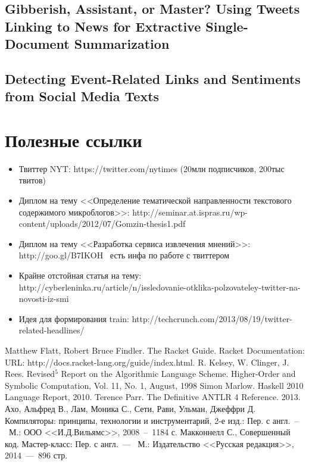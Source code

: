 \documentclass[12pt,a4paper,oneside]{extarticle}
\begin{document}
    \subsection{Gibberish, Assistant, or Master? Using Tweets Linking to News for Extractive Single-Document Summarization}
    \subsection{Detecting Event-Related Links and Sentiments from Social Media Texts}

\section{Полезные ссылки}

    \begin{itemize}
        \item Твиттер NYT: https://twitter.com/nytimes (20млн подписчиков, 200тыс твитов)
        \item Диплом на тему <<Определение тематической направленности текстового содержимого микроблогов>>: http://seminar.at.ispras.ru/wp-content/uploads/2012/07/Gomzin-thesis1.pdf
        \item Диплом на тему <<Разработка сервиса извлечения мнений>>: http://goo.gl/B7IKOH \
            есть инфа по работе с твиттером
        \item Крайне отстойная статья на тему: http://cyberleninka.ru/article/n/issledovanie-otklika-polzovateley-twitter-na-novosti-iz-smi
        \item Идея для формирования train: http://techcrunch.com/2013/08/19/twitter-related-headlines/

    \end{itemize}


\clearpage

\begin{thebibliography}{0}
     Matthew Flatt, Robert Bruce Findler. The Racket Guide. Racket Documentation: URL: http://docs.racket-lang.org/guide/index.html.
    \bibitem{r5rs} R. Kelsey, W. Clinger, J. Rees. Revised$^5$ Report on the Algorithmic Language Scheme. Higher-Order and Symbolic Computation, Vol. 11, No. 1, August, 1998
    \bibitem{haskell} Simon Marlow. Haskell 2010 Language Report, 2010.
    \bibitem{antlr} Terence Parr. The Definitive ANTLR 4 Reference. 2013.
    \bibitem{dragon} Ахо, Альфред В., Лам, Моника С., Сети, Рави, Ульман, Джеффри Д. Компиляторы: принципы, технологии и инструментарий, 2-е изд.: Пер. с англ.~--~М.: ООО <<И.Д.Вильямс>>, 2008~--~1184 с.
    \bibitem{mcconnell} Макконнелл С., Совершенный код. Мастер-класс: Пер. с англ.~---~ М.: Издательство <<Русская редакция>>, 2014~---~896 стр.        
\end{thebibliography}
\end{document}
